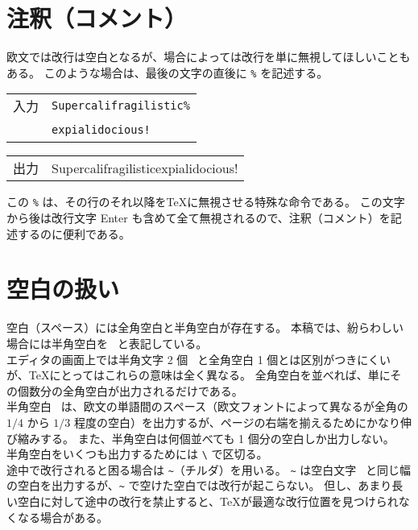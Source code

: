 \section{注釈（コメント）}
欧文では改行は空白となるが、場合によっては改行を単に無視してほしいこともある。
このような場合は、最後の文字の直後に \texttt{\%} を記述する。
\begin{longtable}[l]{@{}c|l@{}}
  入力 & \verb'Supercalifragilistic'\texttt{\%} \\
  \    & \verb'expialidocious!'                 \\
\end{longtable}
\begin{longtable}[l]{@{}c|l@{}}
  出力 & Supercalifragilisticexpialidocious! \\
\end{longtable}
この \texttt{\%} は、その行のそれ以降を\TeX{}に無視させる特殊な命令である。
この文字から後は改行文字 Enter も含めて全て無視されるので、注釈（コメント）を記述するのに便利である。
\section{空白の扱い}
空白（スペース）には全角空白と半角空白が存在する。
本稿では、紛らわしい場合には半角空白を \textvisiblespace\ と表記している。\\

エディタの画面上では半角文字 2 個 \textvisiblespace\textvisiblespace\ と全角空白 1 個とは区別がつきにくいが、\TeX{}にとってはこれらの意味は全く異なる。
全角空白を並べれば、単にその個数分の全角空白が出力されるだけである。\\

半角空白 \textvisiblespace\ は、欧文の単語間のスペース（欧文フォントによって異なるが全角の $1/4$ から $1/3$ 程度の空白）を出力するが、ページの右端を揃えるためにかなり伸び縮みする。
また、半角空白は何個並べても 1 個分の空白しか出力しない。\\

半角空白をいくつも出力するためには \verb'\' で区切る。\\

途中で改行されると困る場合は \verb'~'（チルダ）を用いる。
\verb'~' は空白文字 \textvisiblespace\ と同じ幅の空白を出力するが、\verb'~' で空けた空白では改行が起こらない。
但し、あまり長い空白に対して途中の改行を禁止すると、\TeX{}が最適な改行位置を見つけられなくなる場合がある。\\

